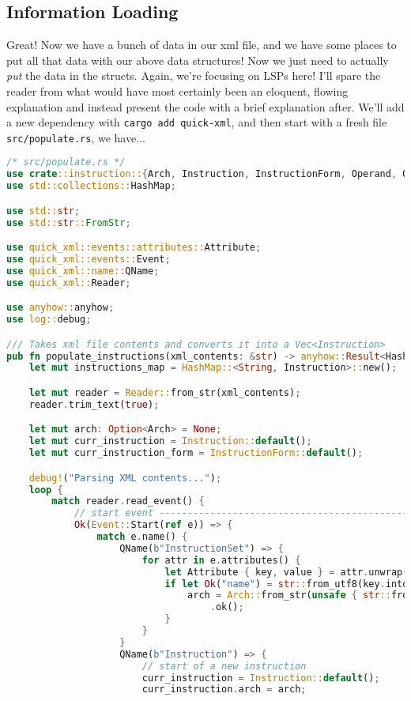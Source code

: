 \subsection{Information Loading}

Great! Now we have a bunch of data in our xml file, and we have some places to put all that data with our above data structures! Now we just need to actually \textit{put} the data in the structs. Again, we're focusing on LSPs here! I'll spare the reader from what would have most certainly been an eloquent, flowing explanation and instead present the code with a brief explanation after. We'll add a new dependency with \texttt{cargo add quick-xml}, and then start with a fresh file \texttt{src/populate.rs}, we have...

\begin{lstlisting}[language=rust]
/* src/populate.rs */
use crate::instruction::{Arch, Instruction, InstructionForm, Operand, OperandType};
use std::collections::HashMap;

use std::str;
use std::str::FromStr;

use quick_xml::events::attributes::Attribute;
use quick_xml::events::Event;
use quick_xml::name::QName;
use quick_xml::Reader;

use anyhow::anyhow;
use log::debug;

/// Takes xml file contents and converts it into a Vec<Instruction>
pub fn populate_instructions(xml_contents: &str) -> anyhow::Result<HashMap<String, Instruction>> {
    let mut instructions_map = HashMap::<String, Instruction>::new();

    let mut reader = Reader::from_str(xml_contents);
    reader.trim_text(true);

    let mut arch: Option<Arch> = None;
    let mut curr_instruction = Instruction::default();
    let mut curr_instruction_form = InstructionForm::default();

    debug!("Parsing XML contents...");
    loop {
        match reader.read_event() {
            // start event ------------------------------------------------------------------------
            Ok(Event::Start(ref e)) => {
                match e.name() {
                    QName(b"InstructionSet") => {
                        for attr in e.attributes() {
                            let Attribute { key, value } = attr.unwrap();
                            if let Ok("name") = str::from_utf8(key.into_inner()) {
                                arch = Arch::from_str(unsafe { str::from_utf8_unchecked(&value) })
                                    .ok();
                            }
                        }
                    }
                    QName(b"Instruction") => {
                        // start of a new instruction
                        curr_instruction = Instruction::default();
                        curr_instruction.arch = arch;


\end{lstlisting}
